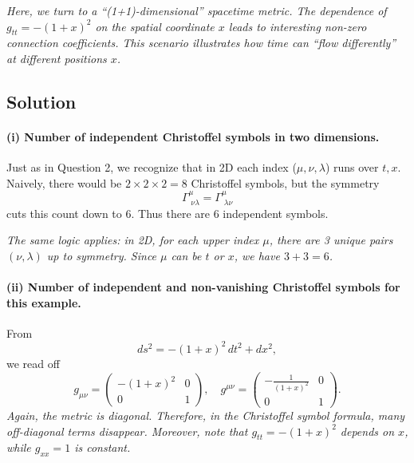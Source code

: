 \documentclass{article}
\begin{document}
\emph{Here, we turn to a “(1+1)-dimensional” spacetime metric. The dependence of \(g_{tt} = -(1+x)^2\) on the spatial coordinate \(x\) leads to interesting non-zero connection coefficients. This scenario illustrates how time can “flow differently” at different positions \(x\).}

\subsection*{Solution}

\paragraph{(i) Number of independent Christoffel symbols in two dimensions.}

Just as in Question 2, we recognize that in 2D each index (\(\mu,\nu,\lambda\)) runs over \({t,x}\). Naively, there would be \(2 \times 2 \times 2 = 8\) Christoffel symbols, but the symmetry
\[
\Gamma^\mu_{\;\nu\lambda} = \Gamma^\mu_{\;\lambda\nu}
\]
cuts this count down to \(6\). Thus there are \(\boxed{6}\) independent symbols.

\emph{The same logic applies: in 2D, for each upper index \(\mu\), there are 3 unique pairs \((\nu,\lambda)\) up to symmetry. Since \(\mu\) can be \(t\) or \(x\), we have \(3+3 = 6\).}

\paragraph{(ii) Number of independent and non-vanishing Christoffel symbols for this example.}

From
\[
ds^2 = -(1+x)^2 \, dt^2 + dx^2,
\]
we read off
\[
g_{\mu\nu} =
\begin{pmatrix}
-(1+x)^2 & 0 \\
0 & 1
\end{pmatrix},
\quad
g^{\mu\nu} =
\begin{pmatrix}
-\frac{1}{(1+x)^2} & 0 \\
0 & 1
\end{pmatrix}.
\]
\emph{Again, the metric is diagonal. Therefore, in the Christoffel symbol formula, many off-diagonal terms disappear. Moreover, note that \(g_{tt} = -(1+x)^2\) depends on \(x\), while \(g_{xx} = 1\) is constant.}
\end{document}
